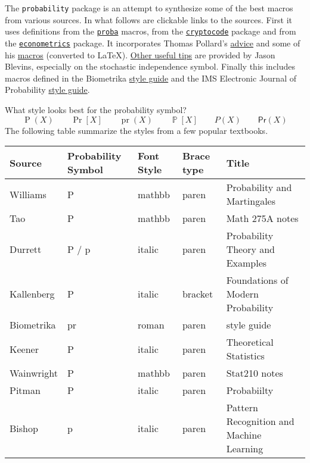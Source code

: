 \documentclass[11pt,letterpaper]{ltxguide}
\begin{document}
The \texttt{probability} package is an attempt to synthesize some of the best macros from various sources.  In what follows are clickable links to the sources.  First it uses definitions from the \href{https://www.ctan.org/tex-archive/macros/latex/contrib/proba?lang=en}{\texttt{proba}} macros, from the \href{https://www.ctan.org/pkg/cryptocode}{\texttt{cryptocode}} package and from the \href{https://www.ctan.org/pkg/econometrics}{\texttt{econometrics}} package.  It incorporates Thomas Pollard's \href{http://www.stat.yale.edu/~pollard/Courses/600.spring2017/Handouts/fonts.pdf}{advice} and some of his \href{http://www.stat.yale.edu/~pollard/LaTeX/}{macros} (converted to LaTeX).  \href{https://jblevins.org/log/latex-tips}{Other useful tips} are provided by Jason Blevins, especially on the stochastic independence symbol.  Finally this includes macros defined in the Biometrika \href{https://academic.oup.com/biomet/pages/General_Instructions}{style guide} and the IMS Electronic Journal of Probability \href{http://www.e-publications.org/ims/support/ims-instructions.html}{style guide}.

What style looks best for the probability symbol?
\[
  \operatorname{P}(X) \qquad   \operatorname{Pr}[X] \qquad \operatorname{pr}(X) \qquad \operatorname{\mathbb P}[X] \qquad P(X) \qquad \mathbf{\mathsf{Pr}}(X)
\]
The following table summarize the styles from a few popular textbooks.


\begin{tabular}{l p{1.7cm} p{1.5cm} p{1.5cm} l }
Source & Probability Symbol & Font Style &  Brace type & Title\\
\hline
Williams & P & mathbb & paren & Probability and Martingales\\
Tao & P & mathbb & paren & Math 275A notes\\
Durrett & P / p & italic & paren & Probability Theory and Examples\\
Kallenberg & P & italic & bracket & Foundations of Modern Probability\\
Biometrika & pr & roman & paren & style guide\\
Keener & P & italic & paren & Theoretical Statistics\\
Wainwright & P &  mathbb & paren & Stat210 notes\\
Pitman & P & italic  & paren & Probabiilty\\
Bishop & p & italic & paren & Pattern Recognition and Machine Learning\\
\hline
\end{tabular}
\end{document}
